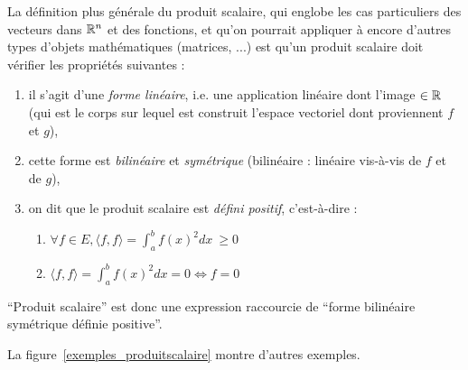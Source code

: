 La définition plus générale du produit scalaire, qui englobe les cas particuliers des vecteurs dans $\mathbb{R}^n$ et des fonctions, et qu'on pourrait appliquer à encore d'autres types d'objets mathématiques (matrices, ...) est qu'un produit scalaire doit vérifier les propriétés suivantes :

\begin{enumerate}
\item il s'agit d'une \emph{forme linéaire}, i.e. une application
  linéaire dont l'image $\in \mathbb{R}$ (qui est le corps sur lequel est
  construit l'espace vectoriel dont proviennent $f$ et $g$),
\item cette forme est \emph{bilinéaire} et \emph{symétrique}
  (bilinéaire : linéaire vis-à-vis de $f$ et de $g$),
\item on dit que le produit scalaire est \emph{défini positif},
  c'est-à-dire :
\begin{enumerate}
\item $\forall f \in E, \langle f, f \rangle=\int_a^bf(x)^2 dx~\geq 0 $ 
\item $\langle f, f \rangle=\int_a^bf(x)^2 dx=0 \Longleftrightarrow f=0$
\end{enumerate}
\end{enumerate}
``Produit scalaire'' est donc une expression raccourcie de ``forme
bilinéaire symétrique définie positive''. 

La figure~\ref{exemples_produitscalaire} montre d'autres exemples.

